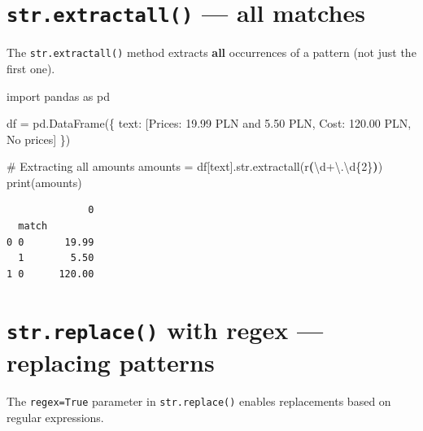 \documentclass[
  english,
  letterpaper,
  DIV=11,
  numbers=noendperiod]{scrreprt}
\newenvironment{Shaded}{\begin{snugshade}}{\end{snugshade}}
\newcommand{\BuiltInTok}[1]{\textcolor[rgb]{0.00,0.23,0.31}{#1}}
\newcommand{\CharTok}[1]{\textcolor[rgb]{0.13,0.47,0.30}{#1}}
\newcommand{\CommentTok}[1]{\textcolor[rgb]{0.37,0.37,0.37}{#1}}
\newcommand{\DecValTok}[1]{\textcolor[rgb]{0.68,0.00,0.00}{#1}}
\newcommand{\ImportTok}[1]{\textcolor[rgb]{0.00,0.46,0.62}{#1}}
\newcommand{\KeywordTok}[1]{\textcolor[rgb]{0.00,0.23,0.31}{\textbf{#1}}}
\newcommand{\NormalTok}[1]{\textcolor[rgb]{0.00,0.23,0.31}{#1}}
\newcommand{\OperatorTok}[1]{\textcolor[rgb]{0.37,0.37,0.37}{#1}}
\newcommand{\StringTok}[1]{\textcolor[rgb]{0.13,0.47,0.30}{#1}}
\newcommand{\VerbatimStringTok}[1]{\textcolor[rgb]{0.13,0.47,0.30}{#1}}
\begin{document}
\section{\texorpdfstring{\texttt{str.extractall()} --- all
matches}{str.extractall() --- all matches}}\label{str.extractall-all-matches}

The \texttt{str.extractall()} method extracts \textbf{all} occurrences
of a pattern (not just the first one).

\begin{Shaded}
\begin{Highlighting}[]
\ImportTok{import}\NormalTok{ pandas }\ImportTok{as}\NormalTok{ pd}

\NormalTok{df }\OperatorTok{=}\NormalTok{ pd.DataFrame(\{}
    \StringTok{\textquotesingle{}text\textquotesingle{}}\NormalTok{: [}\StringTok{\textquotesingle{}Prices: 19.99 PLN and 5.50 PLN\textquotesingle{}}\NormalTok{, }\StringTok{\textquotesingle{}Cost: 120.00 PLN\textquotesingle{}}\NormalTok{, }\StringTok{\textquotesingle{}No prices\textquotesingle{}}\NormalTok{]}
\NormalTok{\})}

\CommentTok{\# Extracting all amounts}
\NormalTok{amounts }\OperatorTok{=}\NormalTok{ df[}\StringTok{\textquotesingle{}text\textquotesingle{}}\NormalTok{].}\BuiltInTok{str}\NormalTok{.extractall(}\VerbatimStringTok{r\textquotesingle{}}\KeywordTok{(}\DecValTok{\textbackslash{}d}\OperatorTok{+}\CharTok{\textbackslash{}.}\DecValTok{\textbackslash{}d}\OperatorTok{\{2\}}\KeywordTok{)}\VerbatimStringTok{\textquotesingle{}}\NormalTok{)}
\BuiltInTok{print}\NormalTok{(amounts)}
\end{Highlighting}
\end{Shaded}

\begin{verbatim}
              0
  match        
0 0       19.99
  1        5.50
1 0      120.00
\end{verbatim}

\section{\texorpdfstring{\texttt{str.replace()} with regex --- replacing
patterns}{str.replace() with regex --- replacing patterns}}\label{str.replace-with-regex-replacing-patterns}

The \texttt{regex=True} parameter in \texttt{str.replace()} enables
replacements based on regular expressions.
\end{document}
